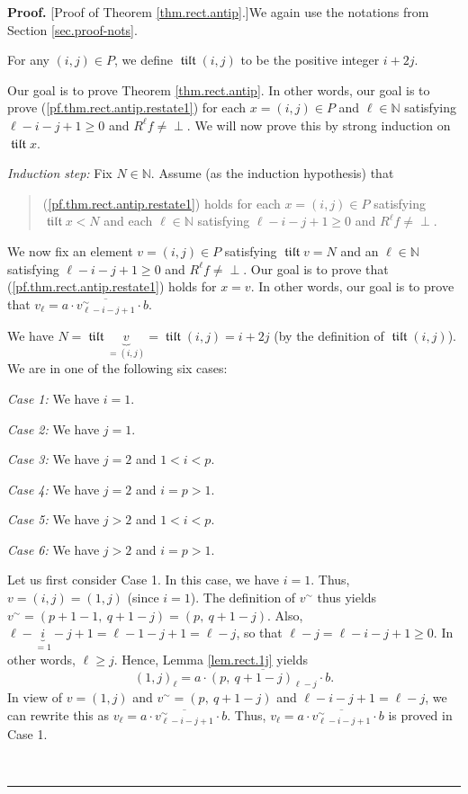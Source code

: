 \documentclass[numbers=enddot,12pt,final,onecolumn,notitlepage]{scrartcl}%
\theoremstyle{definition}
\newenvironment{verlong}{}{}
\newenvironment{statement}{\begin{quote}}{\end{quote}}
\newcommand{\undf}{\operatorname*{\bot}}
\DeclareMathOperator{\tilt}{\mathfrak{tilt}}
\newenvironment{proof}[1][Proof]{\noindent\textbf{#1.} }{\ \rule{0.5em}{0.5em}}
\begin{document}
\begin{verlong}
\begin{proof}
[Proof of Theorem \ref{thm.rect.antip}.]We again use the notations from
Section \ref{sec.proof-nots}.

For any $\left(  i,j\right)  \in P$, we define $\tilt \left(  i,j\right)  $ to
be the positive integer $i+2j$.

Our goal is to prove Theorem \ref{thm.rect.antip}. In other words, our goal is
to prove (\ref{pf.thm.rect.antip.restate1}) for each $x=\left(  i,j\right)
\in P$ and $\ell\in\mathbb{N}$ satisfying $\ell-i-j+1\geq0$ and $R^{\ell}%
f\neq\undf$. We will now prove this by strong induction on $\tilt x$.

\textit{Induction step:} Fix $N\in\mathbb{N}$. Assume (as the induction
hypothesis) that

\begin{statement}
(\ref{pf.thm.rect.antip.restate1}) holds for each $x=\left(  i,j\right)  \in
P$ satisfying $\tilt x<N$ and each $\ell\in\mathbb{N}$ satisfying
$\ell-i-j+1\geq0$ and $R^{\ell}f\neq\undf$.
\end{statement}

We now fix an element $v=\left(  i,j\right)  \in P$ satisfying $\tilt v=N$ and
an $\ell\in\mathbb{N}$ satisfying $\ell-i-j+1\geq0$ and $R^{\ell}f\neq\undf$.
Our goal is to prove that (\ref{pf.thm.rect.antip.restate1}) holds for $x=v$.
In other words, our goal is to prove that $v_{\ell}=a\cdot\overline
{v_{\ell-i-j+1}^{\sim}}\cdot b$. \medskip

We have $N=\tilt \underbrace{v}_{=\left(  i,j\right)  }=\tilt \left(
i,j\right)  =i+2j$ (by the definition of $\tilt \left(  i,j\right)  $). We are
in one of the following six cases:

\textit{Case 1:} We have $i=1$.

\textit{Case 2:} We have $j=1$.

\textit{Case 3:} We have $j=2$ and $1<i<p$.

\textit{Case 4:} We have $j=2$ and $i=p>1$.

\textit{Case 5:} We have $j>2$ and $1<i<p$.

\textit{Case 6:} We have $j>2$ and $i=p>1$. \medskip

Let us first consider Case 1. In this case, we have $i=1$. Thus, $v=\left(
i,j\right)  =\left(  1,j\right)  $ (since $i=1$). The definition of $v^{\sim}$
thus yields $v^{\sim}=\left(  p+1-1,\ q+1-j\right)  =\left(  p,\ q+1-j\right)
$. Also, $\ell-\underbrace{i}_{=1}-j+1=\ell-1-j+1=\ell-j$, so that
$\ell-j=\ell-i-j+1\geq0$. In other words, $\ell\geq j$. Hence, Lemma
\ref{lem.rect.1j} yields%
\[
\left(  1,j\right)  _{\ell}=a\cdot\overline{\left(  p,\ q+1-j\right)
_{\ell-j}}\cdot b.
\]
In view of $v=\left(  1,j\right)  $ and $v^{\sim}=\left(  p,\ q+1-j\right)  $
and $\ell-i-j+1=\ell-j$, we can rewrite this as $v_{\ell}=a\cdot
\overline{v_{\ell-i-j+1}^{\sim}}\cdot b$. Thus, $v_{\ell}=a\cdot
\overline{v_{\ell-i-j+1}^{\sim}}\cdot b$ is proved in Case 1. \medskip


\end{proof}
\end{verlong}
\end{document}
